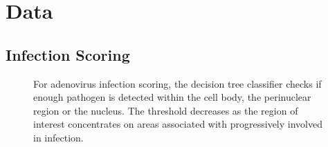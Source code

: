 \chapter{Data}

\section{Infection Scoring}
\label{sec:infection-scoring}

\begin{figure}
\centering
{}
\caption[Decision tree for adenovirus infection scoring.]{For adenovirus infection scoring, the decision tree classifier checks if enough pathogen is detected within the cell body, the perinuclear region or the nucleus. The threshold decreases as the region of interest concentrates on areas associated with progressively involved in infection.}
\end{figure}

